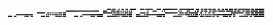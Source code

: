 \documentclass[10pt]{article}
\theoremstyle{plain}
\theoremstyle{definition}
\begin{document}
\begin{table*}[b]
{\begin{minipage}{5.32in}
\[\begin{array}{@{}r@{}}
\begin{array}{@{}l@{}}
\end{array}
\mynnl
\begin{array}{@{}l@{}}
\a\a\a\a\a\a\a\a\a\a\a\a\a\a\a\a\a\a\a\a\a\a\a\a\a\a\a\a\a\a\a\a\a\a\a\a \a\a\a\a\a\a\a\a\a\a\a\a\a\a\a\a\a\a\a\a\a\a\a\a\a\a\a\a\a\a\a\a\a\a\a\a \a\a\a\a\a\a\a\a\a\a\a\a\a\a\a\a\a\a\a\a\a\a\a\a\a\a\a\a\a\a\a\a\b\b\b\b \a\b\b\b\a\a\a\b\a\a\b\b\a\a\b\b\a\a\b\b\b\b\b\b\a\a\a\a\b\b\b\b\a\b\b\b \b\b\b\b\a\a\a\a\b\b\b\b\a\a\b\b\b\b\b\b\b\b\b\b\b\b\b\b\a\a\b\b\b\b\b\b \b\b\b\b\b\b\b\b\a\a\b\b\b\a\a\b\b\a\b\b\b\a\b\b\b\a\b\b\b\a\a\b\b\a\a\b \b\a\b\b\b\a\b\b\b\b\a\b\b\b\a\b\b\b\b\b\b\b\b\b\b\b\a\b\b\b\a\b\b\b\b\b \b\b\b\b\mynl
\a\a\a\a\a\a\a\a\a\a\a\a\a\a\a\a\a\a\a\a\a\a\a\a\a\a\a\a\a\a\a\a\a\a\a\a \a\a\a\a\a\a\a\a\a\a\a\a\a\a\a\a\a\a\a\a\a\a\a\a\a\a\a\a\b\b\b\b\b\b\b\b \b\b\b\b\b\b\b\b\b\b\b\b\b\b\b\b\b\b\b\b\b\b\b\b\a\a\a\a\b\b\b\b\a\a\a\a \b\b\b\b\a\b\b\b\a\b\a\b\a\b\a\b\a\b\a\b\a\a\a\a\a\a\a\a\a\a\a\a\a\a\a\b \a\a\a\a\b\b\b\b\a\a\a\a\a\b\a\b\a\a\a\a\a\a\a\a\a\a\a\a\a\b\a\b\a\a\a\a \a\b\b\b\a\a\a\a\a\b\a\b\b\a\a\b\b\a\b\b\b\a\a\b\b\a\b\b\b\b\a\b\b\b\b\b \b\b\a\b\b\b\b\b\b\b\a\b\b\a\b\b\b\a\a\b\b\a\b\b\b\b\a\b\b\b\b\b\b\b\a\b \b\b\b\b\mynl
\a\a\a\a\a\a\a\a\a\a\a\a\a\a\a\a\a\a\a\a\a\a\a\a\a\a\a\a\a\a\a\a\a\a\a\a \b\b\b\b\b\b\b\b\a\a\b\b\a\b\a\b\a\b\a\b\a\b\b\b\a\b\b\b\a\a\a\a\a\a\a\a \a\a\a\a\a\a\a\a\a\a\a\a\a\a\a\a\a\a\a\a\a\a\a\a\a\a\a\a\b\b\b\b\b\b\b\b \b\a\b\b\a\b\b\b\a\b\a\b\a\b\b\b\a\b\b\b\a\a\a\a\a\a\a\a\b\b\b\b\b\a\b\b \a\a\a\a\a\a\a\a\a\a\a\a\a\a\a\a\b\b\b\b\b\b\b\b\b\b\b\b\a\a\b\b\b\b\a\b \b\b\a\b\b\b\b\b\b\b\b\b\a\a\b\b\a\a\a\b\a\a\b\b\a\a\b\b\a\a\a\a\a\a\a\a \a\a\a\a\a\a\a\a\b\b\b\b\b\b\b\b\b\b\b\b\a\a\b\b\b\b\a\b\b\b\a\b\b\b\b\b \b\b\b\b\mynl
\a\a\a\a\a\a\a\a\a\a\a\a\a\a\a\a\b\b\b\b\b\b\b\b\b\b\b\b\b\b\b\b\a\a\a\a \a\a\a\a\a\a\a\a\a\b\a\b\a\b\a\b\a\b\b\b\a\b\a\b\a\b\b\b\a\a\a\a\a\a\a\a \a\a\a\a\a\a\a\a\b\b\b\b\b\b\b\b\b\b\b\b\b\b\b\b\b\b\b\b\a\a\a\a\a\a\a\a \a\b\a\b\b\b\b\b\b\b\b\b\b\b\a\b\b\b\b\b\a\a\a\a\b\b\b\b\a\a\a\a\b\a\b\b \b\b\b\b\b\b\b\b\b\b\b\b\b\b\b\b\a\a\a\a\a\a\a\a\a\a\a\a\a\b\a\b\a\b\a\b \b\b\b\b\a\b\a\b\a\b\b\b\a\b\a\b\a\b\a\b\a\b\a\b\a\b\a\b\b\b\b\b\b\b\b\b \b\b\b\b\b\b\b\b\b\a\b\b\a\a\a\a\a\a\a\a\a\b\a\b\b\b\a\b\b\b\b\b\b\b\a\b \b\b\b\b\mynl
\a\a\a\a\a\a\a\a\b\b\b\b\a\a\b\b\a\a\a\a\a\a\a\a\b\b\b\b\a\a\b\b\a\a\a\a \a\a\a\a\b\b\b\b\a\b\b\b\a\a\a\a\a\a\b\b\b\b\b\b\a\b\b\b\a\a\a\a\a\a\a\a \b\b\b\b\a\a\b\b\a\a\a\a\a\a\a\a\b\b\b\b\a\a\b\b\b\b\b\b\a\a\a\a\b\b\b\b \b\b\b\b\b\b\a\b\a\a\b\b\b\b\b\b\a\b\b\b\a\a\a\a\b\b\b\b\b\b\b\b\b\b\b\b \a\a\a\a\a\a\a\a\b\b\b\b\b\a\b\b\a\a\a\a\a\a\a\a\b\b\b\b\b\b\b\b\a\a\a\a \a\a\b\b\b\b\b\b\b\b\b\b\a\a\b\b\b\b\a\b\b\b\b\b\b\a\b\b\a\a\b\b\a\a\a\a \b\b\b\b\b\a\b\b\a\a\b\b\a\a\a\a\b\b\b\b\b\b\b\b\a\a\b\b\a\a\b\b\b\b\b\b \b\b\b\b\mynl

\end{array}
\end{array}\]
\end{minipage}}
\end{table*}
\end{document}
